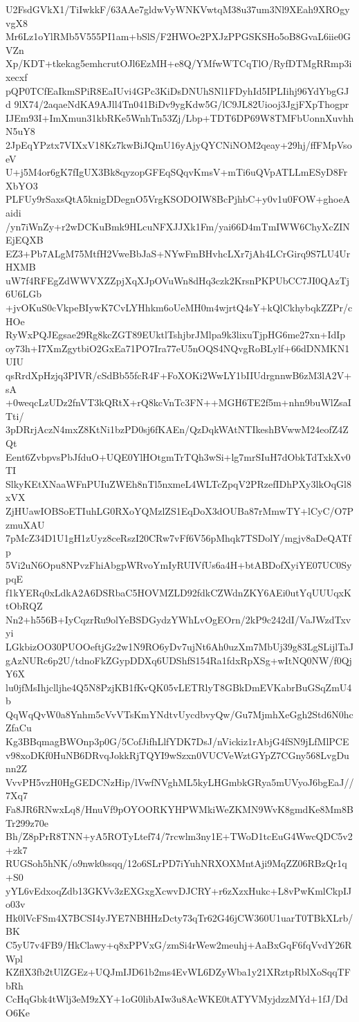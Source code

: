 U2FsdGVkX1/TiIwkkF/63AAe7gldwVyWNKVwtqM38u37um3Nl9XEah9XROgyvgX8
Mr6Lz1oYlRMb5V555PI1am+bSlS/F2HWOe2PXJzPPGSKSHo5oB8GvaL6iie0GVZn
Xp/KDT+tkekag5emhcrutOJl6EzMH+e8Q/YMfwWTCqTlO/RyfDTMgRRmp3ixecxf
pQP0TCfEaIkmSPiR8EaIUvi4GPc3KiDsDNUhSNl1FDyhId5IPLIihj96YdYbgGJd
9lX74/2aqaeNdKA9AJll4Tn041BiDv9ygKdw5G/lC9JL82Uiooj3JgjFXpThogpr
IJEm93I+ImXmun31kbRKe5WnhTn53Zj/Lbp+TDT6DP69W8TMFbUonnXuvhhN5uY8
2JpEqYPztx7VIXxV18Kz7kwBiJQmU16yAjyQYCNiNOM2qeay+29hj/ffFMpVsoeV
U+j5M4or6gK7fIgUX3Bk8qyzopGFEqSQqvKmsV+mTi6uQVpATLLmESyD8FrXbYO3
PLFUy9rSaxsQtA5knigDDegnO5VrgKSODOIW8BcPjhbC+y0v1u0FOW+ghoeAaidi
/yn7iWnZy+r2wDCKuBmk9HLcuNFXJJXk1Fm/yai66D4mTmIWW6ChyXcZINEjEQXB
EZ3+Pb7ALgM75MtfH2VweBbJaS+NYwFmBHvhcLXr7jAh4LCrGirq9S7LU4UrHXMB
uW7f4RFEgZdWWVXZZpjXqXJpOVuWn8dHq3czk2KrsnPKPUbCC7JI0QAzTj6U6LGb
+jvOKuS0cVkpeBIywK7CvLYHhkm6oUeMH0m4wjrtQ4sY+kQlCkhybqkZZPr/cHOe
RyWxPQJEgsae29Rg8kcZGT89EUktlTshjbrJMlpa9k3lixuTjpHG6me27xn+IdIp
oy73h+I7XmZgytbiO2GxEa71PO7Ira77eU5nOQS4NQvgRoBLylf+66dDNMKN1UIU
qsRrdXpHzjq3PIVR/cSdBb55fcR4F+FoXOKi2WwLY1bIIUdrgnnwB6zM3lA2V+sA
+0weqcLzUDz2fnVT3kQRtX+rQ8kcVnTc3FN++MGH6TE2f5m+nhn9buWlZsaITti/
3pDRrjAczN4mxZ8KtNi1bzPD0sj6fKAEn/QzDqkWAtNTIkeshBVwwM24eofZ4ZQt
Eent6ZvbpvsPbJfduO+UQE0YlHOtgmTrTQh3wSi+lg7mrSIuH7dObkTdTxkXv0TI
SlkyKEtXNaaWFnPUIuZWEh8nTl5nxmeL4WLTcZpqV2PRzefIDhPXy3lkOqGl8xVX
ZjHUawIOBSoETIuhLG0RXoYQMzlZS1EqDoX3dOUBa87rMmwTY+lCyC/O7PzmuXAU
7pMcZ34D1U1gH1zUyz8ceRszI20CRw7vFf6V56pMhqk7TSDolY/mgjv8aDeQATfp
5Vi2uN6Opu8NPvzFhiAbgpWRvoYmIyRUIVfUs6a4H+btABDofXyiYE07UC0SypqE
f1kYERq0xLdkA2A6DSRbaC5HOVMZLD92fdkCZWdnZKY6AEi0utYqUUUqxKtObRQZ
Nn2+h556B+IyCqzrRu9olYeBSDGydzYWhLvOgEOrn/2kP9c242dI/VaJWzdTxvyi
LGkbizOO30PUOOeftjGz2w1N9RO6yDv7ujNt6Ah0uzXm7MbUj39g83LgSLijlTaJ
gAzNURc6p2U/tdnoFkZGypDDXq6UDShfS154Ra1fdxRpXSg+wItNQ0NW/f0QjY6X
lu0jfMsIhjclljhe4Q5N8PzjKB1fKvQK05vLETRlyT8GBkDmEVKabrBuGSqZmU4b
QqWqQvW0a8Ynhm5cVvVTsKmYNdtvUycdbvyQw/Gu7MjmhXeGgh2Std6N0hcZfaCu
Kg3BBqmagBWOnp3p0G/5CofJifhLlfYDK7DsJ/nVickiz1rAbjG4fSN9jLfMlPCE
v98xoDKf0HuNB6DRvqJokkRjTQYI9wSzxn0VUCVeWztGYpZ7CGny568LvgDunn2Z
VvvPH5vzH0HgGEDCNzHip/lVwfNVghML5kyLHGmbkGRya5mUVyoJ6bgEaJ//7Xq7
Fa8JR6RNwxLq8/HnuVf9pOYOORKYHPWMkiWeZKMN9WvK8gmdKe8Mm8BTr299z70e
Bh/Z8pPrR8TNN+yA5ROTyLtef74/7rcwlm3ny1E+TWoD1tcEuG4WwcQDC5v2+zk7
RUGSoh5hNK/o9nwk0ssqq/12o6SLrPD7iYuhNRXOXMntAji9MqZZ06RBzQr1q+S0
yYL6vEdxoqZdb13GKVv3zEXGxgXcwvDJCRY+r6zXzxHukc+L8vPwKmlCkpIJo03v
Hk0lVcFSm4X7BCSI4yJYE7NBHHzDcty73qTr62G46jCW360U1uarT0TBkXLrb/BK
C5yU7v4FB9/HkClawy+q8xPPVxG/zmSi4rWew2meuhj+AaBxGqF6fqVvdY26RWpl
KZflX3fb2tUlZGEz+UQJmIJD61b2ms4EvWL6DZyWba1y21XRztpRblXoSqqTFbRh
CcHqGbk4tWlj3eM9zXY+1oG0libAIw3u8AcWKE0tATYVMyjdzzMYd+1fJ/DdO6Ke
